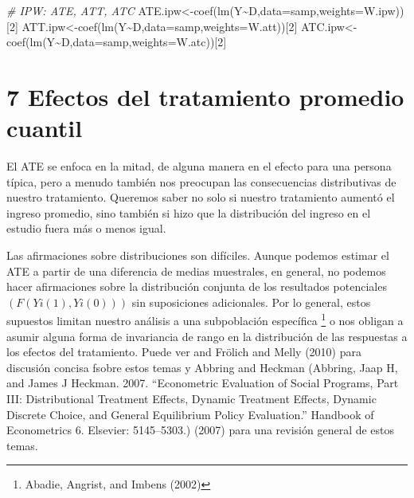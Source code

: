 \documentclass[
]{article}
\newenvironment{Shaded}{\begin{snugshade}}{\end{snugshade}}
\newcommand{\AttributeTok}[1]{\textcolor[rgb]{0.77,0.63,0.00}{#1}}
\newcommand{\CommentTok}[1]{\textcolor[rgb]{0.56,0.35,0.01}{\textit{#1}}}
\newcommand{\DecValTok}[1]{\textcolor[rgb]{0.00,0.00,0.81}{#1}}
\newcommand{\FunctionTok}[1]{\textcolor[rgb]{0.00,0.00,0.00}{#1}}
\newcommand{\NormalTok}[1]{#1}
\newcommand{\OtherTok}[1]{\textcolor[rgb]{0.56,0.35,0.01}{#1}}
\newcommand{\SpecialCharTok}[1]{\textcolor[rgb]{0.00,0.00,0.00}{#1}}
\begin{document}
\begin{Shaded}
\begin{Highlighting}[]
\CommentTok{\# IPW: ATE, ATT, ATC }
\NormalTok{ATE.ipw}\OtherTok{\textless{}{-}}\FunctionTok{coef}\NormalTok{(}\FunctionTok{lm}\NormalTok{(Y}\SpecialCharTok{\textasciitilde{}}\NormalTok{D,}\AttributeTok{data=}\NormalTok{samp,}\AttributeTok{weights=}\NormalTok{W.ipw))[}\DecValTok{2}\NormalTok{]}
\NormalTok{ATT.ipw}\OtherTok{\textless{}{-}}\FunctionTok{coef}\NormalTok{(}\FunctionTok{lm}\NormalTok{(Y}\SpecialCharTok{\textasciitilde{}}\NormalTok{D,}\AttributeTok{data=}\NormalTok{samp,}\AttributeTok{weights=}\NormalTok{W.att))[}\DecValTok{2}\NormalTok{] }
\NormalTok{ATC.ipw}\OtherTok{\textless{}{-}}\FunctionTok{coef}\NormalTok{(}\FunctionTok{lm}\NormalTok{(Y}\SpecialCharTok{\textasciitilde{}}\NormalTok{D,}\AttributeTok{data=}\NormalTok{samp,}\AttributeTok{weights=}\NormalTok{W.atc))[}\DecValTok{2}\NormalTok{]}
\end{Highlighting}
\end{Shaded}

\hypertarget{efectos-del-tratamiento-promedio-cuantil}{%
\section{7 Efectos del tratamiento promedio
cuantil}\label{efectos-del-tratamiento-promedio-cuantil}}

El ATE se enfoca en la mitad, de alguna manera en el efecto para una
persona típica, pero a menudo también nos preocupan las consecuencias
distributivas de nuestro tratamiento. Queremos saber no solo si nuestro
tratamiento aumentó el ingreso promedio, sino también si hizo que la
distribución del ingreso en el estudio fuera más o menos igual.

Las afirmaciones sobre distribuciones son difíciles. Aunque podemos
estimar el ATE a partir de una diferencia de medias muestrales, en
general, no podemos hacer afirmaciones sobre la distribución conjunta de
los resultados potenciales \((F(Yi (1), Yi(0)))\) sin suposiciones
adicionales. Por lo general, estos supuestos limitan nuestro análisis a
una subpoblación específica \footnote{Abadie, Angrist, and Imbens (2002)}
o nos obligan a asumir alguna forma de invariancia de rango en la
distribución de las respuestas a los efectos del tratamiento. Puede ver
and Frölich and Melly (2010) para discusión concisa fsobre estos temas y
Abbring and Heckman (Abbring, Jaap H, and James J Heckman. 2007.
``Econometric Evaluation of Social Programs, Part III: Distributional
Treatment Effects, Dynamic Treatment Effects, Dynamic Discrete Choice,
and General Equilibrium Policy Evaluation.'' Handbook of Econometrics 6.
Elsevier: 5145--5303.) (2007) para una revisión general de estos temas.
\end{document}
